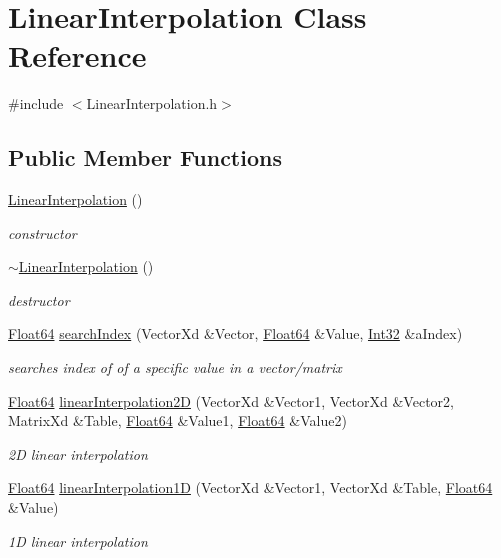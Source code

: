 \hypertarget{class_linear_interpolation}{}\section{Linear\+Interpolation Class Reference}
\label{class_linear_interpolation}


{\ttfamily \#include $<$Linear\+Interpolation.\+h$>$}

\subsection*{Public Member Functions}
\begin{DoxyCompactItemize}
\item 
\hyperlink{class_linear_interpolation_aaae2ec77e7767bb5fc7ca34a6e1197f1}{Linear\+Interpolation} ()
\begin{DoxyCompactList}\small\item\em constructor \end{DoxyCompactList}\item 
\hyperlink{class_linear_interpolation_a36a34fa39c430e05bdc073c1ac9ad4df}{$\sim$\+Linear\+Interpolation} ()
\begin{DoxyCompactList}\small\item\em destructor \end{DoxyCompactList}\item 
\hyperlink{group___tools_ga3f1431cb9f76da10f59246d1d743dc2c}{Float64} \hyperlink{class_linear_interpolation_aa9faf7177964de6d3b68a69cdbf7ef1a}{search\+Index} (Vector\+Xd \&Vector, \hyperlink{group___tools_ga3f1431cb9f76da10f59246d1d743dc2c}{Float64} \&Value, \hyperlink{_linear_interpolation_8h_adf1ef98b7070177c7c709b0b82276a07}{Int32} \&a\+Index)
\begin{DoxyCompactList}\small\item\em searches index of of a specific value in a vector/matrix \end{DoxyCompactList}\item 
\hyperlink{group___tools_ga3f1431cb9f76da10f59246d1d743dc2c}{Float64} \hyperlink{class_linear_interpolation_aaf48c1f0fa673ada9b8d6218690161f4}{linear\+Interpolation2D} (Vector\+Xd \&Vector1, Vector\+Xd \&Vector2, Matrix\+Xd \&Table, \hyperlink{group___tools_ga3f1431cb9f76da10f59246d1d743dc2c}{Float64} \&Value1, \hyperlink{group___tools_ga3f1431cb9f76da10f59246d1d743dc2c}{Float64} \&Value2)
\begin{DoxyCompactList}\small\item\em 2D linear interpolation \end{DoxyCompactList}\item 
\hyperlink{group___tools_ga3f1431cb9f76da10f59246d1d743dc2c}{Float64} \hyperlink{class_linear_interpolation_aee1cf48d321cf6708470d9119fbf79e4}{linear\+Interpolation1D} (Vector\+Xd \&Vector1, Vector\+Xd \&Table, \hyperlink{group___tools_ga3f1431cb9f76da10f59246d1d743dc2c}{Float64} \&Value)
\begin{DoxyCompactList}\small\item\em 1D linear interpolation \end{DoxyCompactList}\end{DoxyCompactItemize}



